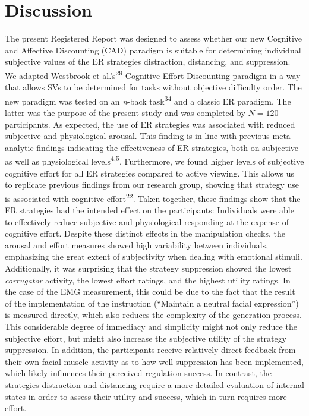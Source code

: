 \documentclass[
  man,floatsintext]{apa6}
\begin{document}
\hypertarget{discussion}{%
\section{Discussion}\label{discussion}}

The present Registered Report was designed to assess whether our new Cognitive and Affective Discounting (CAD) paradigm is suitable for determining individual subjective values of the ER strategies distraction, distancing, and suppression.
We adapted Westbrook et al.'s\textsuperscript{29} Cognitive Effort Discounting paradigm in a way that allows SVs to be determined for tasks without objective difficulty order.
The new paradigm was tested on an \emph{n}-back task\textsuperscript{34} and a classic ER paradigm.
The latter was the purpose of the present study and was completed by \(N=120\) participants.
As expected, the use of ER strategies was associated with reduced subjective and physiological arousal.
This finding is in line with previous meta-analytic findings indicating the effectiveness of ER strategies, both on subjective as well as physiological levels\textsuperscript{4,5}.
Furthermore, we found higher levels of subjective cognitive effort for all ER strategies compared to active viewing.
This allows us to replicate previous findings from our research group, showing that strategy use is associated with cognitive effort\textsuperscript{22}.
Taken together, these findings show that the ER strategies had the intended effect on the participants: Individuals were able to effectively reduce subjective and physiological responding at the expense of cognitive effort.
Despite these distinct effects in the manipulation checks, the arousal and effort measures showed high variability between individuals, emphasizing the great extent of subjectivity when dealing with emotional stimuli.
Additionally, it was surprising that the strategy suppression showed the lowest \emph{corrugator} activity, the lowest effort ratings, and the highest utility ratings.
In the case of the EMG measurement, this could be due to the fact that the result of the implementation of the instruction (``Maintain a neutral facial expression'') is measured directly, which also reduces the complexity of the generation process.
This considerable degree of immediacy and simplicity might not only reduce the subjective effort, but might also increase the subjective utility of the strategy suppression.
In addition, the participants receive relatively direct feedback from their own facial muscle activity as to how well suppression has been implemented, which likely influences their perceived regulation success.
In contrast, the strategies distraction and distancing require a more detailed evaluation of internal states in order to assess their utility and success, which in turn requires more effort.
\end{document}
